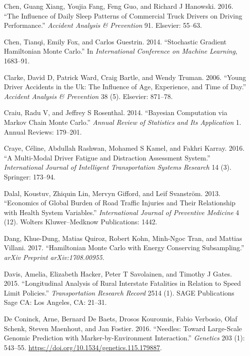 \documentclass[12pt]{book}
\numberwithin{equation}{chapter}
\begin{document}
\leavevmode\hypertarget{ref-chen2016influence}{}%
Chen, Guang Xiang, Youjia Fang, Feng Guo, and Richard J Hanowski. 2016. ``The Influence of Daily Sleep Patterns of Commercial Truck Drivers on Driving Performance.'' \emph{Accident Analysis \& Prevention} 91. Elsevier: 55--63.

\leavevmode\hypertarget{ref-chen2014stochastic}{}%
Chen, Tianqi, Emily Fox, and Carlos Guestrin. 2014. ``Stochastic Gradient Hamiltonian Monte Carlo.'' In \emph{International Conference on Machine Learning}, 1683--91.

\leavevmode\hypertarget{ref-clarke2006young}{}%
Clarke, David D, Patrick Ward, Craig Bartle, and Wendy Truman. 2006. ``Young Driver Accidents in the Uk: The Influence of Age, Experience, and Time of Day.'' \emph{Accident Analysis \& Prevention} 38 (5). Elsevier: 871--78.

\leavevmode\hypertarget{ref-craiu2014bayesian}{}%
Craiu, Radu V, and Jeffrey S Rosenthal. 2014. ``Bayesian Computation via Markov Chain Monte Carlo.'' \emph{Annual Review of Statistics and Its Application} 1. Annual Reviews: 179--201.

\leavevmode\hypertarget{ref-craye2016multi}{}%
Craye, Céline, Abdullah Rashwan, Mohamed S Kamel, and Fakhri Karray. 2016. ``A Multi-Modal Driver Fatigue and Distraction Assessment System.'' \emph{International Journal of Intelligent Transportation Systems Research} 14 (3). Springer: 173--94.

\leavevmode\hypertarget{ref-dalal2013economics}{}%
Dalal, Koustuv, Zhiquin Lin, Mervyn Gifford, and Leif Svanström. 2013. ``Economics of Global Burden of Road Traffic Injuries and Their Relationship with Health System Variables.'' \emph{International Journal of Preventive Medicine} 4 (12). Wolters Kluwer--Medknow Publications: 1442.

\leavevmode\hypertarget{ref-dang2017hamiltonian}{}%
Dang, Khue-Dung, Matias Quiroz, Robert Kohn, Minh-Ngoc Tran, and Mattias Villani. 2017. ``Hamiltonian Monte Carlo with Energy Conserving Subsampling.'' \emph{arXiv Preprint arXiv:1708.00955}.

\leavevmode\hypertarget{ref-davis2015longitudinal}{}%
Davis, Amelia, Elizabeth Hacker, Peter T Savolainen, and Timothy J Gates. 2015. ``Longitudinal Analysis of Rural Interstate Fatalities in Relation to Speed Limit Policies.'' \emph{Transportation Research Record} 2514 (1). SAGE Publications Sage CA: Los Angeles, CA: 21--31.

\leavevmode\hypertarget{ref-Coninck2016}{}%
De Coninck, Arne, Bernard De Baets, Drosos Kourounis, Fabio Verbosio, Olaf Schenk, Steven Maenhout, and Jan Fostier. 2016. ``Needles: Toward Large-Scale Genomic Prediction with Marker-by-Environment Interaction.'' \emph{Genetics} 203 (1): 543--55. \url{https://doi.org/10.1534/genetics.115.179887}.
\end{document}
